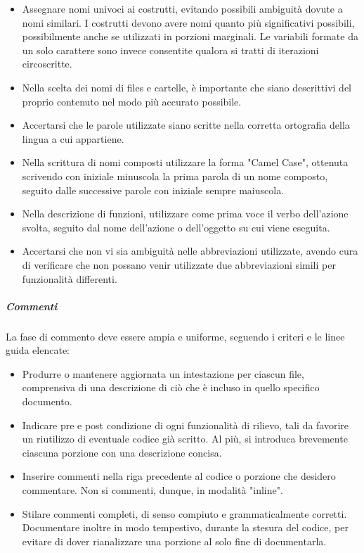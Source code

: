\begin{itemize}
\item
Assegnare nomi univoci ai costrutti, evitando possibili ambiguità dovute a nomi similari. I costrutti devono avere nomi quanto più significativi possibili, possibilmente anche se utilizzati in porzioni marginali. Le variabili formate da un solo carattere sono invece consentite qualora si tratti di iterazioni circoscritte.
\item
Nella scelta dei nomi di files e cartelle, è importante che siano descrittivi del proprio contenuto nel modo più accurato possibile.
\item
Accertarsi che le parole utilizzate siano scritte nella corretta ortografia della lingua a cui appartiene.
\item
Nella scrittura di nomi composti utilizzare la forma "Camel Case", ottenuta scrivendo con iniziale minuscola la prima parola di un nome composto, seguito dalle successive parole con iniziale sempre maiuscola.
\item
Nella descrizione di funzioni, utilizzare come prima voce il verbo dell'azione svolta, seguito dal nome dell'azione o dell'oggetto su cui viene eseguita.
\item
Accertarsi che non vi sia ambiguità nelle abbreviazioni utilizzate, avendo cura di verificare che non possano venir utilizzate due abbreviazioni simili per funzionalità differenti.

\end{itemize}


\subparagraph{Commenti}
La fase di commento deve essere ampia e uniforme, seguendo i criteri e le linee guida elencate:

\begin{itemize}
\item
Produrre o mantenere aggiornata un intestazione per ciascun file, comprensiva di una descrizione di ciò che è incluso in quello specifico documento.
\item
Indicare pre e post condizione di ogni funzionalità di rilievo, tali da favorire un riutilizzo di eventuale codice già scritto. Al più, si introduca brevemente ciascuna porzione con una descrizione concisa.
\item
Inserire commenti nella riga precedente al codice o porzione che desidero commentare. Non si commenti, dunque, in modalità "inline".
\item
Stilare commenti completi, di senso compiuto e grammaticalmente corretti. Documentare inoltre in modo tempestivo, durante la stesura del codice, per evitare di dover rianalizzare una porzione al solo fine di documentarla.
\end{itemize}

